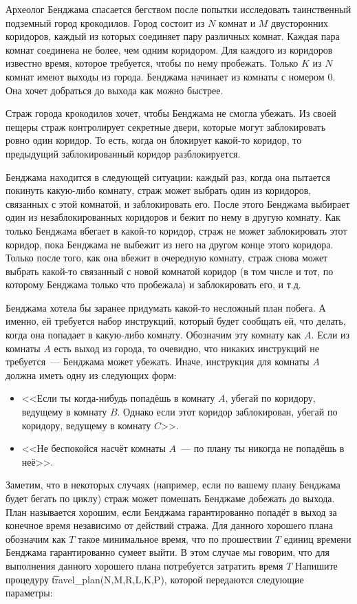 Археолог Бенджама спасается бегством после попытки исследовать таинственный подземный город крокодилов. Город состоит из $N$ комнат и $M$ двусторонних коридоров, каждый из которых соединяет пару различных комнат. Каждая пара комнат соединена не более, чем одним коридором. Для каждого из коридоров известно время, которое требуется, чтобы по нему пробежать. Только $K$ из $N$ комнат имеют выходы из города. Бенджама начинает из комнаты с номером $0$. Она хочет добраться до выхода как можно быстрее.

Страж города крокодилов хочет, чтобы Бенджама не смогла убежать. Из своей пещеры страж контролирует секретные двери, которые могут заблокировать ровно один коридор. То есть, когда он блокирует какой-то коридор, то предыдущий заблокированный коридор разблокируется.

Бенджама находится в следующей ситуации: каждый раз, когда она пытается покинуть какую-либо комнату, страж может выбрать один из коридоров, связанных с этой комнатой, и заблокировать его. После этого Бенджама выбирает один из незаблокированных коридоров и бежит по нему в другую комнату. Как только Бенджама вбегает в какой-то коридор, страж не может заблокировать этот коридор, пока Бенджама не выбежит из него на другом конце этого коридора. Только после того, как она вбежит в очередную комнату, страж снова может выбрать какой-то связанный с новой комнатой коридор (в том числе и тот, по которому Бенджама только что пробежала) и заблокировать его, и т.д.

Бенджама хотела бы заранее придумать какой-то несложный план побега. А именно, ей требуется набор инструкций, который будет сообщать ей, что делать, когда она попадает в какую-либо комнату. Обозначим эту комнату как $A$. Если из комнаты $A$ есть выход из города, то очевидно, что никаких инструкций не требуется~--- Бенджама может убежать. Иначе, инструкция для комнаты $A$ должна иметь одну из следующих форм:

\begin{itemize}
\item <<Если ты когда-нибудь попадёшь в комнату $A$, убегай по коридору, ведущему в комнату $B$. Однако если этот коридор заблокирован, убегай по коридору, ведущему в комнату $C$>>.
\item <<Не беспокойся насчёт комнаты $A$~--- по плану ты никогда не попадёшь в неё>>.
\end{itemize}

Заметим, что в некоторых случаях (например, если по вашему плану Бенджама будет бегать по циклу) страж может помешать Бенджаме добежать до выхода. План называется хорошим, если Бенджама гарантированно попадёт в выход за конечное время независимо от действий стража. Для данного хорошего плана обозначим как $T$ такое минимальное время, что по прошествии $T$ единиц времени Бенджама гарантированно сумеет выйти. В этом случае мы говорим, что для выполнения данного хорошего плана потребуется затратить время $T$ Напишите процедуру \t{travel\_plan(N,M,R,L,K,P)}, которой передаются следующие параметры:

